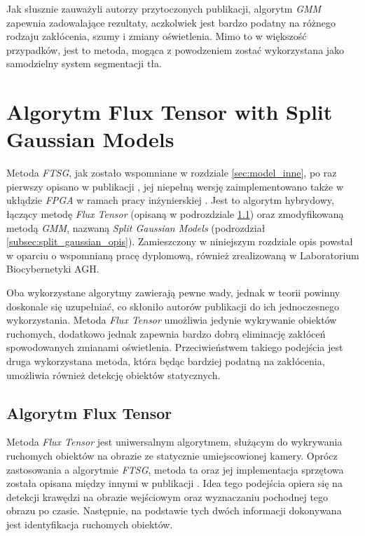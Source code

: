 Jak słusznie zauważyli autorzy przytoczonych publikacji, algorytm \textit{GMM} zapewnia zadowalające rezultaty, aczkolwiek jest bardzo podatny na różnego rodzaju zakłócenia, szumy i zmiany oświetlenia. 
Mimo to w większość przypadków, jest to metoda, mogąca z powodzeniem zostać wykorzystana jako samodzielny system segmentacji tła.  

\section{Algorytm Flux Tensor with Split Gaussian Models}
\label{sec:ftsg}

Metoda \textit{FTSG}, jak zostało wspomniane w rozdziale \ref{sec:model_inne}, po raz pierwszy opisano w publikacji \cite{wang_14}, jej niepełną wersję zaimplementowano także w ukłądzie \textit{FPGA} w ramach pracy inżynierskiej \cite{janus_15}. Jest to algorytm hybrydowy, łączący metodę \textit{Flux Tensor} (opisaną w podrozdziale \ref{subsec:flux_tensor_opis}) oraz zmodyfikowaną metodą \textit{GMM}, nazwaną \textit{Split Gaussian Models} (podrozdział \ref{subsec:split_gaussian_opis}). Zamieszczony w niniejszym rozdziale opis powstał w oparciu o wspomnianą pracę dyplomową, również zrealizowaną w Laboratorium Biocybernetyki AGH.

Oba wykorzystane algorytmy zawierają pewne wady, jednak w teorii powinny doskonale się uzupełniać, co skłoniło autorów publikacji do ich jednoczesnego wykorzystania. Metoda \textit{Flux Tensor} umożliwia jedynie wykrywanie obiektów ruchomych, dodatkowo jednak zapewnia bardzo dobrą eliminację zakłóceń spowodowanych zmianami oświetlenia. Przeciwieństwem takiego podejścia jest druga wykorzystana metoda, która będąc bardziej podatną na zakłócenia, umożliwia również detekcję obiektów statycznych.

\subsection{Algorytm Flux Tensor}
\label{subsec:flux_tensor_opis}

Metoda \textit{Flux Tensor} jest uniwersalnym algorytmem, służącym do wykrywania ruchomych obiektów na obrazie ze statycznie umiejscowionej kamery. Oprócz zastosowania a algorytmie \textit{FTSG}, metoda ta oraz jej implementacja sprzętowa została opisana między innymi w publikacji \cite{janus_16_flux}. Idea tego podejścia opiera się na detekcji krawędzi na obrazie wejściowym oraz wyznaczaniu pochodnej tego obrazu po czasie. Następnie, na podstawie tych dwóch informacji dokonywana jest identyfikacja ruchomych obiektów.


